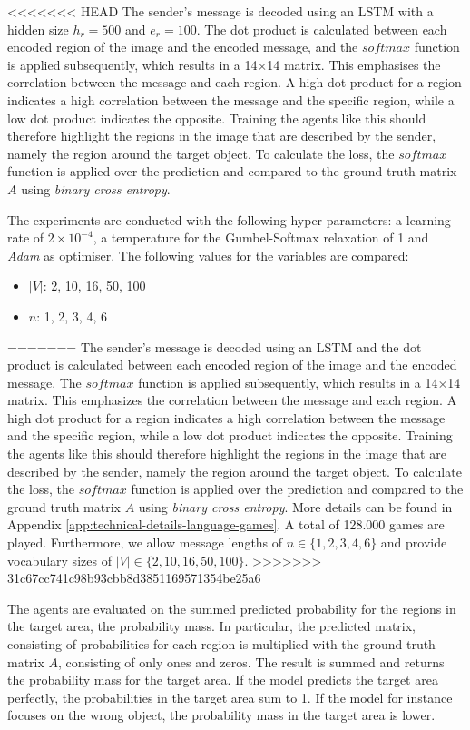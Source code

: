 \documentclass[11pt]{article}
\begin{document}
<<<<<<< HEAD
The sender's message is decoded using an LSTM with a hidden size $h_r=500$ and $e_r=100$.
The dot product is calculated between each encoded region of the image and the encoded message, and the $softmax$ function is applied subsequently, which results in a 14$\times$14 matrix.
This emphasises the correlation between the message and each region.
A high dot product for a region indicates a high correlation between the message and the specific region, while a low dot product indicates the opposite.
Training the agents like this should therefore highlight the regions in the image that are described by the sender, namely the region around the target object.
To calculate the loss, the $softmax$ function is applied over the prediction and compared to the ground truth matrix $A$ using \emph{binary cross entropy}.

The experiments are conducted with the following hyper-parameters: a learning rate of $2\times10^{-4}$, a temperature for the Gumbel-Softmax relaxation of 1 and \emph{Adam} \citep{Kingma2015} as optimiser.
The following values for the variables are compared:
\begin{itemize}[noitemsep,topsep=0pt]
        \item $|V|$: 2, 10, 16, 50, 100 
        \item $n$: 1, 2, 3, 4,  6
\end{itemize}
=======
The sender's message is decoded using an LSTM and the dot product is calculated between each encoded region of the image and the encoded message.
The $softmax$ function is applied subsequently, which results in a 14$\times$14 matrix.
This emphasizes the correlation between the message and each region.
A high dot product for a region indicates a high correlation between the message and the specific region, while a low dot product indicates the opposite.
Training the agents like this should therefore highlight the regions in the image that are described by the sender, namely the region around the target object.
To calculate the loss, the $softmax$ function is applied over the prediction and compared to the ground truth matrix $A$ using \emph{binary cross entropy}.
More details can be found in Appendix \ref{app:technical-details-language-games}.
A total of 128.000 games are played.
Furthermore, we allow message lengths of $n \in \{1,2,3,4,6\}$ and provide vocabulary sizes of $|V| \in \{2,10,16,50,100\}$.
>>>>>>> 31c67cc741c98b93cbb8d3851169571354be25a6

The agents are evaluated on the summed predicted probability for the regions in the target area, the probability mass.
In particular, the predicted matrix, consisting of probabilities for each region is multiplied with the ground truth matrix $A$, consisting of only ones and zeros.
The result is summed and returns the probability mass for the target area.
If the model predicts the target area perfectly, the probabilities in the target area sum to 1.
If the model for instance focuses on the wrong object, the probability mass in the target area is lower.
\end{document}
